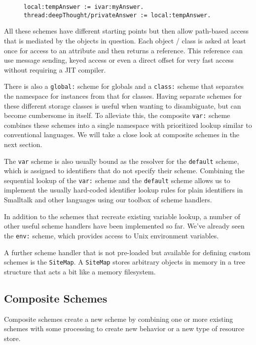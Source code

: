 \documentclass[preprint,authoryear]{llncs}
\begin{document}
\begin{figure}[htbp]
\begin{lstlisting}[style=numbers,label=local-variables,caption=Different memory variables.]
local:tempAnswer := ivar:myAnswer.
thread:deepThought/privateAnswer := local:tempAnswer.
\end{lstlisting}
\end{figure}

All these schemes have different starting points but then allow path-based access
that is mediated by the objects in question.   Each object / class is asked at least
once for access to an attribute and then returns a reference.   This reference can
use message sending, keyed access or even a direct offset for very fast
access without requiring a JIT compiler.

There is also a {\tt global:} scheme for globals and a {\tt class:} scheme that separates
the namespace for instances from that for classes.  Having separate schemes for
these different storage classes is useful when wanting to disambiguate,
but can become cumbersome in itself.  To alleviate this, the composite
{\tt var:} scheme combines these schemes into a single namespace
with prioritized lookup similar to conventional languages.  We will take
a close look at composite schemes in the next section.  

The {\tt var} scheme is also usually bound as the resolver for the {\tt default}
scheme, which is assigned to identifiers that do not specify their scheme.
Combining the sequential lookup of the {\tt var:} scheme and the {\tt default}
scheme allows us to implement the usually hard-coded identifier lookup
rules for plain identifiers in Smalltalk and other languages using
our toolbox of scheme handlers.

In addition to the schemes that recreate existing variable lookup, a number
of other useful scheme handlers have been implemented so far.  We've
already seen the {\tt env:} scheme, which provides access to Unix
environment variables.  

A further scheme handler that is not pre-loaded but available for defining
custom schemes is the {\tt SiteMap}.  A {\tt SiteMap} stores arbitrary objects
in memory in a tree structure that acts a bit like a memory filesystem.

\subsection{Composite Schemes}
\label{compositeSchemes}
Composite schemes  create a new scheme by combining one or 
more existing schemes with some processing to create new behavior
or a new type of resource store. 
\end{document}
